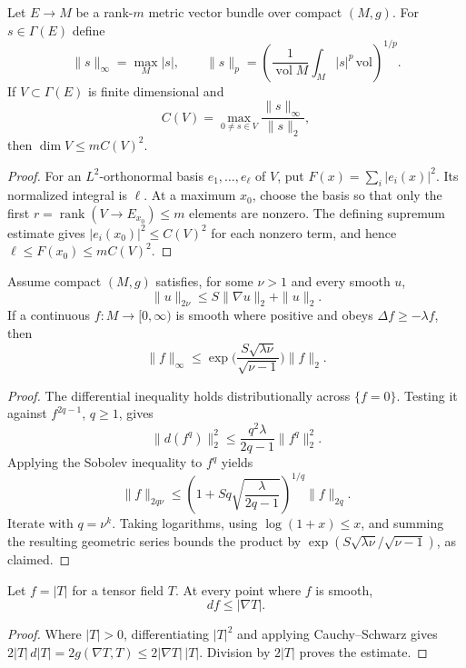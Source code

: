 \begin{lemma}
  \label{lem:pet-ch9-li-dimension-estimate}
  Let $E\to M$ be a rank-$m$ metric vector bundle over compact $(M,g)$.  For
  $s\in\Gamma(E)$ define
  \[
    \|s\|_\infty=\max_M|s|,
    \qquad
    \|s\|_p=\left(\frac1{\operatorname{vol}M}
      \int_M|s|^p\,\mathrm{vol}\right)^{1/p}.
  \]
  If $V\subset\Gamma(E)$ is finite dimensional and
  \[
    C(V)=\max_{0\ne s\in V}\frac{\|s\|_\infty}{\|s\|_2},
  \]
  then $\dim V\le mC(V)^2$.
\end{lemma}
\begin{proof}
  \sketch
  For an \(L^2\)-orthonormal basis \(e_1,\ldots,e_\ell\) of \(V\), put
  \(F(x)=\sum_i|e_i(x)|^2\).  Its normalized integral is \(\ell\).  At a
  maximum \(x_0\), choose the basis so that only the first
  \(r=\operatorname{rank}(V\to E_{x_0})\le m\) elements are nonzero.  The
  defining supremum estimate gives \(|e_i(x_0)|^2\le C(V)^2\) for each
  nonzero term, and hence
  \(\ell\le F(x_0)\le mC(V)^2\).
\end{proof}

\begin{theorem}
  \label{thm:pet-ch9-moser-iteration}
  Assume compact $(M,g)$ satisfies, for some $\nu>1$ and every smooth $u$,
  \[
    \|u\|_{2\nu}\le S\|\nabla u\|_2+\|u\|_2.
  \]
  If a continuous $f:M\to[0,\infty)$ is smooth where positive and obeys
  $\Delta f\ge-\lambda f$, then
  \[
    \|f\|_\infty\le\exp\Big(\frac{S\sqrt{\lambda\nu}}{\sqrt{\nu-1}}\Big)\|f\|_2.
  \]
\end{theorem}
\begin{proof}
  \sketch
  The differential inequality holds distributionally across \(\{f=0\}\).
  Testing it against \(f^{2q-1}\), \(q\ge1\), gives
  \[
    \|d(f^q)\|_2^2\le\frac{q^2\lambda}{2q-1}\|f^q\|_2^2.
  \]
  Applying the Sobolev inequality to \(f^q\) yields
  \[
    \|f\|_{2q\nu}
    \le\left(1+Sq\sqrt{\frac{\lambda}{2q-1}}\right)^{1/q}\|f\|_{2q}.
  \]
  Iterate with \(q=\nu^k\).  Taking logarithms, using
  \(\log(1+x)\le x\), and summing the resulting geometric series bounds the
  product by
  \(\exp(S\sqrt{\lambda\nu}/\sqrt{\nu-1})\), as claimed.
\end{proof}

\begin{lemma}
  \label{lem:pet-ch9-kato-inequality}
  Let $f=|T|$ for a tensor field $T$.  At every point where $f$ is smooth,
  \[
    df\le|\nabla T|.
  \]
\end{lemma}
\begin{proof}
  \sketch
  Where \(|T|>0\), differentiating \(|T|^2\) and applying Cauchy--Schwarz gives
  \(2|T|\,d|T|=2g(\nabla T,T)\le2|\nabla T|\,|T|\).  Division by
  \(2|T|\) proves the estimate.
\end{proof}

